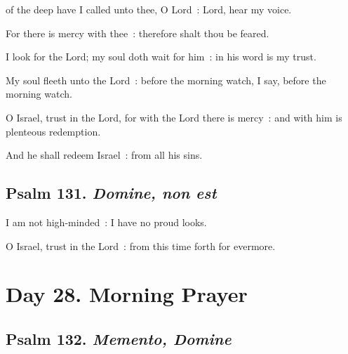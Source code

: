  of the deep have I called unto thee, O Lord~: Lord, hear my voice.\par
{}
For there is mercy with thee~: therefore shalt thou be feared.\par
{}I look for the Lord; my soul doth wait for him~: in his word is my trust.\par
{}My soul fleeth unto the Lord~: before the morning watch, I say, before the morning watch.\par
{}O Israel, trust in the Lord, for with the Lord there is mercy~: and with him is plenteous redemption.\par
{}And he shall redeem Israel~: from all his sins.\par

\subsection{Psalm 131. \textit{Domine, non est}}

 I am not high-minded~: I have no proud looks.\par
{}
O Israel, trust in the Lord~: from this time forth for evermore.\par

\section*{Day 28. Morning Prayer}

\subsection{Psalm 132. \textit{Memento, Domine}}

